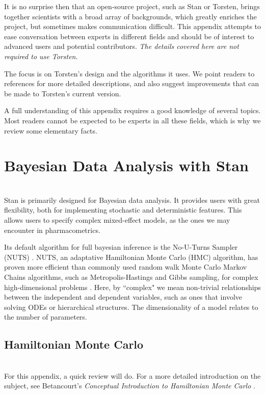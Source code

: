 \documentclass[11pt]{amsart}
\begin{document}
It is no surprise then that an open-source project, such as Stan or Torsten, 
brings together scientists with a broad array of backgrounds, which greatly 
enriches the project, but sometimes makes communication difficult. This 
appendix attempts to ease conversation between experts in different fields 
and should be of interest to advanced users and potential contributors. 
\textit{The details covered here are not required to use Torsten}.

The focus is on Torsten's design and the algorithms it uses. We point readers
to references for more detailed descriptions, and also suggest improvements
that can be made to Torsten's current version.

A full understanding of this appendix requires a good knowledge of several topics.
Most readers cannot be expected to be experts in all these fields, which is
why we review some elementary facts.


\section{Bayesian Data Analysis with Stan} \ \\
Stan is primarily designed for Bayesian data analysis. It provides users with great flexibility,
 both for implementing stochastic and deterministic features. This allows users to specify 
 complex mixed-effect models, as the ones we may encounter in pharmacometrics.

Its default algorithm for full bayesian inference is the No-U-Turns Sampler (NUTS) \cite{HoffmanGelman:2014}. 
NUTS, an adaptative Hamiltonian Monte Carlo (HMC) \cite{Radford:2010} algorithm, has proven more
efficient than commonly used random walk Monte Carlo Markov Chains algorithms, such as 
Metropolis-Hastings and Gibbs sampling, for complex high-dimensional problems \cite{HoffmanGelman:2014}. 
Here, by ``complex" we mean non-trivial relationships between the independent and dependent
variables, such as ones that involve solving ODEs or hierarchical structures. The dimensionality of a model 
relates to the number of parameters.

\subsection{Hamiltonian Monte Carlo} \ \\

For this appendix, a quick review will do. For a more detailed introduction on the subject, see 
Betancourt's \textit{Conceptual Introduction to Hamiltonian Monte Carlo} \cite{Betancourt:2017}.  
\end{document}
